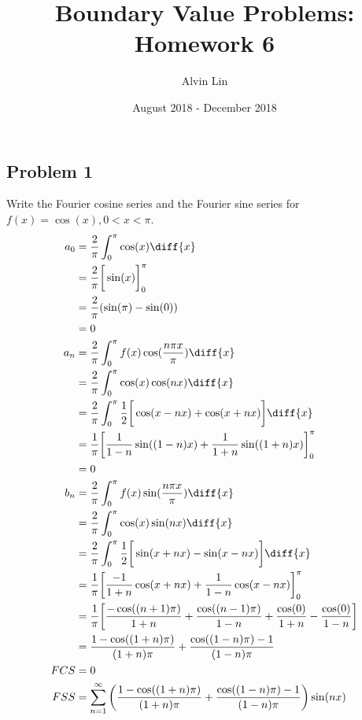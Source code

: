 \documentclass{math}
\title{Boundary Value Problems: Homework 6}
\author{Alvin Lin}
\date{August 2018 - December 2018}
\begin{document}
\maketitle

\subsection*{Problem 1}
Write the Fourier cosine series and the Fourier sine series for
\( f(x) = \cos(x), 0<x<\pi \).
\begin{align*}
  a_0 &= \frac{2}{\pi}\int_{0}^{\pi}\cos(x)\diff{x} \\
  &= \frac{2}{\pi}\bigg[\sin(x)\bigg]_{0}^{\pi} \\
  &= \frac{2}{\pi}(\sin(\pi)-\sin(0)) \\
  &= 0 \\
  a_n &= \frac{2}{\pi}\int_{0}^{\pi}f(x)\cos(\frac{n\pi x}{\pi})\diff{x} \\
  &= \frac{2}{\pi}\int_{0}^{\pi}\cos(x)\cos(nx)\diff{x} \\
  &= \frac{2}{\pi}\int_{0}^{\pi}\frac{1}{2}\bigg[
    \cos(x-nx)+\cos(x+nx)\bigg]\diff{x} \\
  &= \frac{1}{\pi}\bigg[
    \frac{1}{1-n}\sin((1-n)x)+\frac{1}{1+n}\sin((1+n)x)\bigg]_{0}^{\pi} \\
  &= 0 \\
  b_n &= \frac{2}{\pi}\int_{0}^{\pi}f(x)\sin(\frac{n\pi x}{\pi})\diff{x} \\
  &= \frac{2}{\pi}\int_{0}^{\pi}\cos(x)\sin(nx)\diff{x} \\
  &= \frac{2}{\pi}\int_{0}^{\pi}\frac{1}{2}\bigg[
    \sin(x+nx)-\sin(x-nx)\bigg]\diff{x} \\
  &= \frac{1}{\pi}\bigg[
    \frac{-1}{1+n}\cos(x+nx)+\frac{1}{1-n}\cos(x-nx)\bigg]_{0}^{\pi} \\
  &= \frac{1}{\pi}\bigg[
    \frac{-\cos((n+1)\pi)}{1+n}+
    \frac{\cos((n-1)\pi)}{1-n}+
    \frac{\cos(0)}{1+n}-
    \frac{\cos(0)}{1-n}
  \bigg] \\
  &= \frac{1-\cos((1+n)\pi)}{(1+n)\pi}+\frac{\cos((1-n)\pi)-1}{(1-n)\pi} \\
  FCS &= 0 \\
  FSS &= \sum_{n=1}^{\infty}
    \left(
      \frac{1-\cos((1+n)\pi)}{(1+n)\pi}+\frac{\cos((1-n)\pi)-1}{(1-n)\pi}
    \right)\sin(nx)
\end{align*}
\end{document}
